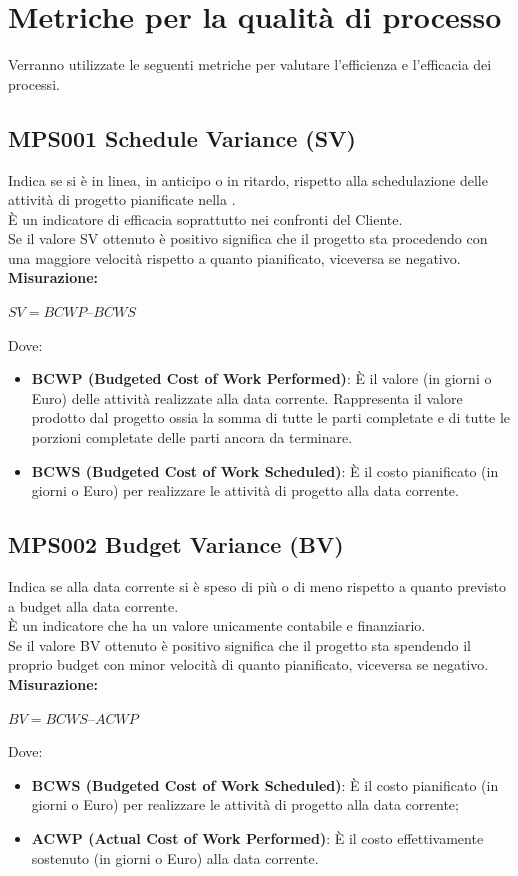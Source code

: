 \documentclass[NormeDiProgetto.tex]{subfiles}
\begin{document}
	\section{Metriche per la qualità di processo} 
	Verranno utilizzate le seguenti metriche per valutare l'efficienza e l'efficacia dei processi.
	
	\subsection{MPS001 Schedule Variance (SV)}
	Indica se si è in linea, in anticipo o in ritardo, rispetto alla schedulazione delle attività di progetto pianificate nella .\\
	È un indicatore di efficacia soprattutto nei confronti del Cliente. \\
	Se il valore SV ottenuto è positivo significa che il progetto sta procedendo con una maggiore velocità rispetto a quanto pianificato, viceversa se negativo.\\
	\textbf{Misurazione:}
	\begin{center}
		$ SV = BCWP – BCWS $
	\end{center}
	Dove: \begin{itemize}
		\item \textbf{BCWP (Budgeted Cost of Work Performed)}: \`{E} il valore (in giorni o Euro) delle attività realizzate alla data corrente.
		Rappresenta il valore prodotto dal progetto ossia la somma di tutte le parti completate e di tutte le porzioni completate delle parti ancora da terminare.
		\item \textbf{BCWS (Budgeted Cost of Work Scheduled)}: \`{E} il costo pianificato (in giorni o Euro) per realizzare le attività di progetto alla data corrente.
	\end{itemize}
	
	\subsection {MPS002 Budget Variance (BV)}
	Indica se alla data corrente si è speso di più o di meno rispetto a quanto previsto a budget alla data corrente.\\
	È un indicatore che ha un valore unicamente contabile e finanziario.\\
	Se il valore BV ottenuto è positivo significa che il progetto sta spendendo il proprio budget con minor velocità di quanto pianificato, viceversa se negativo.\\
	\textbf{Misurazione:}
	\begin{center}
		$ BV = BCWS – ACWP $
	\end{center}
	Dove: \begin{itemize}
		\item \textbf{BCWS (Budgeted Cost of Work Scheduled)}: \`{E} il costo pianificato (in giorni o Euro) per realizzare le attività di progetto alla data corrente;
		\item \textbf{ACWP (Actual Cost of Work Performed)}: \`{E} il costo effettivamente sostenuto (in giorni o Euro) alla data corrente.
	\end{itemize}
\end{document}
